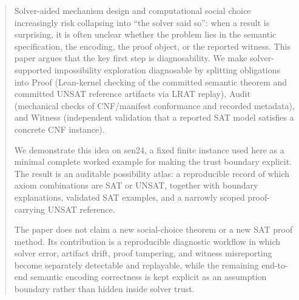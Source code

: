 \begin{abstract}
Solver-aided mechanism design and computational social choice increasingly risk collapsing into ``the solver said so'': when a result is surprising, it is often unclear whether the problem lies in the semantic specification, the encoding, the proof object, or the reported witness. This paper argues that the key first step is diagnosability. We make solver-supported impossibility exploration diagnosable by splitting obligations into Proof (Lean-kernel checking of the committed semantic theorem and committed UNSAT reference artifacts via LRAT replay), Audit (mechanical checks of CNF/manifest conformance and recorded metadata), and Witness (independent validation that a reported SAT model satisfies a concrete CNF instance).

We demonstrate this idea on sen24, a fixed finite instance used here as a minimal complete worked example for making the trust boundary explicit. The result is an auditable possibility atlas: a reproducible record of which axiom combinations are SAT or UNSAT, together with boundary explanations, validated SAT examples, and a narrowly scoped proof-carrying UNSAT reference.

The paper does not claim a new social-choice theorem or a new SAT proof method. Its contribution is a reproducible diagnostic workflow in which solver error, artifact drift, proof tampering, and witness misreporting become separately detectable and replayable, while the remaining end-to-end semantic encoding correctness is kept explicit as an assumption boundary rather than hidden inside solver trust.
\end{abstract}
